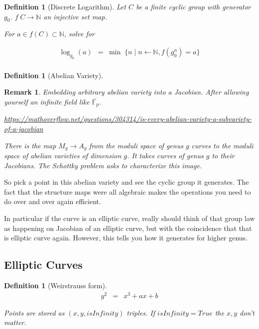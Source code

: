 \documentclass[11pt]{article}
\theoremstyle{change}
\newtheorem{definition}[equation]{Definition}
\newtheorem{remark}[equation]{Remark}
\theoremstyle{nonumberplain}
\numberwithin{equation}{section}
\newcommand\setof[1]{\{ #1 \}}
\begin{document}
\begin{definition}[Discrete Logarithm]
Let $C$ be a finite cyclic group with generator $g_0$. $f \; C \to \mathbb{N}$ an injective set map.

For $a \in f(C) \subset \mathbb{N}$, solve for

\begin{eqnarray*}
\log_{g_0} (a) &=& \text{min} \; \;  \setof { n \mid n \leftarrow \mathbb{N} , f (g_0^n) = a }\\
\end{eqnarray*}

\end{definition}

\begin{definition}[Abelian Variety]
\end{definition}

\begin{remark}
Embedding arbitrary abelian variety into a Jacobian. After allowing yourself an infinite field like $\bar{\mathbb{F}_p}$.

\url{https://mathoverflow.net/questions/304314/is-every-abelian-variety-a-subvariety-of-a-jacobian}

There is the map $M_g \to A_g$ from the moduli space of genus $g$ curves to the moduli space of abelian varieties of dimension $g$. It takes curves of genus $g$ to their Jacobians. The Schottky problem asks to characterize this image.
\end{remark}

So pick a point in this abelian variety and see the cyclic group it generates. The fact that the structure maps were all algebraic makes the operations you need to do over and over again efficient.

In particular if the curve is an elliptic curve, really should think of that group law as happening on Jacobian of an elliptic curve, but with the coincidence that that is elliptic curve again. However, this tells you how it generates for higher genus.

\subsection{Elliptic Curves}

\begin{definition}[Weirstrauss form]
\begin{eqnarray*}
y^2 &=& x^3 + a x + b
\end{eqnarray*}

Points are stored as $(x,y,isInfinity)$ triples. If $isInfinity=True$ the $x,y$ don't matter.

\end{definition}
\end{document}
